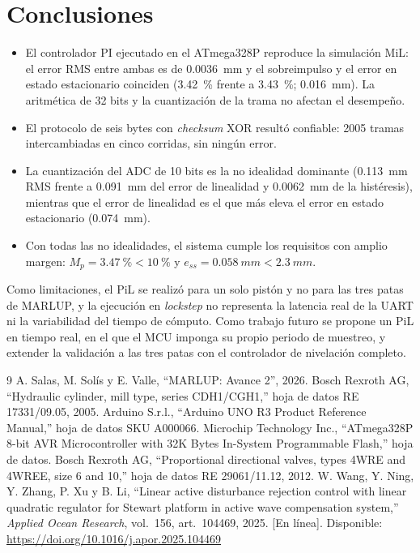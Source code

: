 \documentclass[conference]{IEEEtran}
\begin{document}
\section{Conclusiones}
\label{sec:conclusiones}
\begin{itemize}
\item El controlador PI ejecutado en el ATmega328P reproduce la simulación MiL: el error RMS entre ambas es de \SI{0.0036}{mm} y el sobreimpulso y el error en estado estacionario coinciden (\SI{3.42}{\percent} frente a \SI{3.43}{\percent}; \SI{0.016}{mm}). La aritmética de 32 bits y la cuantización de la trama no afectan el desempeño.
\item El protocolo de seis bytes con \textit{checksum} XOR resultó confiable: 2005 tramas intercambiadas en cinco corridas, sin ningún error.
\item La cuantización del ADC de 10 bits es la no idealidad dominante (\SI{0.113}{mm} RMS frente a \SI{0.091}{mm} del error de linealidad y \SI{0.0062}{mm} de la histéresis), mientras que el error de linealidad es el que más eleva el error en estado estacionario (\SI{0.074}{mm}).
\item Con todas las no idealidades, el sistema cumple los requisitos con amplio margen: $M_p=\SI{3.47}{\percent}<\SI{10}{\percent}$ y $e_{ss}=\SI{0.058}{mm}<\SI{2.3}{mm}$.
\end{itemize}

Como limitaciones, el PiL se realizó para un solo pistón y no para las tres patas de MARLUP, y la ejecución en \textit{lockstep} no representa la latencia real de la UART ni la variabilidad del tiempo de cómputo. Como trabajo futuro se propone un PiL en tiempo real, en el que el MCU imponga su propio periodo de muestreo, y extender la validación a las tres patas con el controlador de nivelación completo.

\begin{thebibliography}{9}
 A. Salas, M. Solís y E. Valle, ``MARLUP: Avance 2'', 2026.
 Bosch Rexroth AG, ``Hydraulic cylinder, mill type, series CDH1/CGH1,'' hoja de datos RE 17331/09.05, 2005.
 Arduino S.r.l., ``Arduino UNO R3 Product Reference Manual,'' hoja de datos SKU A000066.
 Microchip Technology Inc., ``ATmega328P 8-bit AVR Microcontroller with 32K Bytes In-System Programmable Flash,'' hoja de datos.
 Bosch Rexroth AG, ``Proportional directional valves, types 4WRE and 4WREE, size 6 and 10,'' hoja de datos RE 29061/11.12, 2012.
 W. Wang, Y. Ning, Y. Zhang, P. Xu y B. Li, ``Linear active disturbance rejection control with linear quadratic regulator for Stewart platform in active wave compensation system,'' \textit{Applied Ocean Research}, vol.~156, art.~104469, 2025. [En línea]. Disponible: \url{https://doi.org/10.1016/j.apor.2025.104469}
\end{thebibliography}
\end{document}

